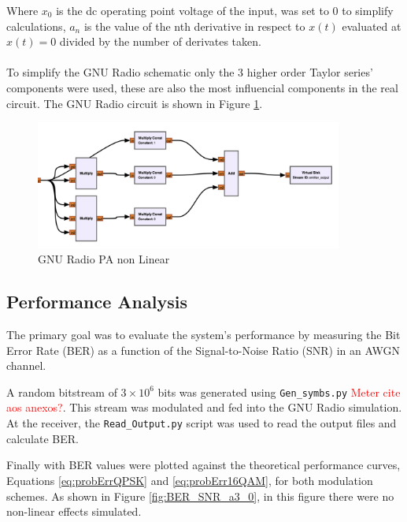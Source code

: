 Where \(x_0\) is the dc operating point voltage of the input, was set to 0 to 
simplify calculations, \(a_n\) is the value of the nth derivative in respect to 
\(x(t)\) evaluated at \(x(t) = 0\) divided by the number of derivates taken.

\paragraph{}
To simplify the GNU Radio schematic only the 3 higher order Taylor series' components were 
used, these are also the most influencial components in the real circuit. The GNU Radio 
circuit is shown in Figure \ref{fig:PA_non_lin}.

\begin{figure}[H]
    \centering
    \includegraphics*[width=0.9\textwidth]{Images/PA_non_lin.png}
    \caption{GNU Radio PA non Linear}
    \label{fig:PA_non_lin}
\end{figure}


\subsection{Performance Analysis}

The primary goal was to evaluate the system's performance by measuring the Bit Error Rate (BER) as a function of the Signal-to-Noise Ratio (SNR) in an AWGN channel.

A random bitstream of $3 \times 10^6$ bits was generated using \texttt{Gen\_symbs.py} \textcolor{red}{Meter cite aos anexos?}. This stream was modulated and fed into the GNU Radio simulation. At the receiver, the \texttt{Read\_Output.py} script was used to read the output files and calculate BER.

Finally with BER values were plotted against the theoretical performance curves, Equations \ref{eq:probErrQPSK} and \ref{eq:probErr16QAM}, for both modulation schemes. As shown in Figure \ref{fig:BER_SNR_a3_0}, in this figure there were no non-linear effects simulated.

